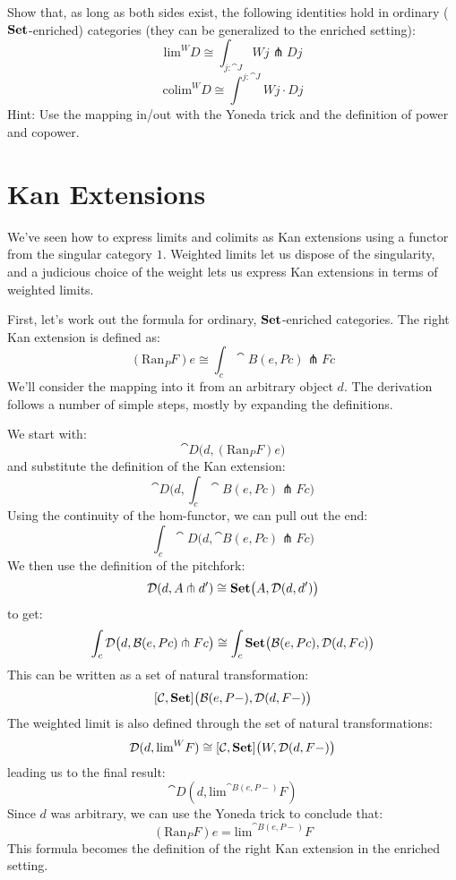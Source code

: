 \documentclass[DaoFP]{subfiles}
\begin{document}
\begin{exercise}
Show that, as long as both sides exist, the following identities hold in ordinary ($\mathbf{Set}$-enriched) categories (they can be generalized to the enriched setting):
\[ \text{lim}^W D \cong \int_{j \colon \cat J} W j \pitchfork D j \]
\[ \text{colim}^W D \cong \int^{j \colon \cat J} W j \cdot D j \]
Hint: Use the mapping in/out with the Yoneda trick and the definition of power and copower.
\end{exercise}

\section{Kan Extensions}

We've seen how to express limits and colimits as Kan extensions using a functor from the singular category $1$. Weighted limits let us dispose of the singularity, and a judicious choice of the weight lets us express Kan extensions in terms of weighted limits. 

First, let's work out the formula for ordinary, $\mathbf{Set}$-enriched categories. The right Kan extension is defined as:
 \[ (\text{Ran}_P F) e \cong \int_c \cat B (e, P c) \pitchfork F c \]
 We'll consider the mapping into it from an arbitrary object $d$. The derivation follows a number of simple steps, mostly by expanding the definitions. 
 
 We start with:
\[ \cat D\big(d, (\text{Ran}_P F) e\big) \]
 and substitute the definition of the Kan extension:
 \[ \cat D\big(d, \int_c \cat B (e, P c) \pitchfork F c\big) \]
Using the continuity of the hom-functor, we can pull out the end:
 \[ \int_c \cat D\big(d,  \cat B (e, P c) \pitchfork F c\big) \]
We then use the definition of the pitchfork:
\[ \mathcal{D} (d, A \pitchfork d') \cong \mathbf{Set}  \big(A, \mathcal{D}(d, d')\big) \]
to get:
 \[ \int_c \mathcal{D}\big(d,  \mathcal{B} (e, P c) \pitchfork F c\big) \cong \int_c \mathbf{Set}\big( \mathcal{B}(e, P c), \mathcal{D}(d, F c)\big)\]
This can be written as a set of natural transformation:
\[ [\mathcal{C}, \mathbf{Set}] \big(\mathcal{B}(e, P-), \mathcal{D}(d, F-)\big) \]
The weighted limit is also defined through the set of natural transformations:
\[  \mathcal D(d, \text{lim}^W F) \cong [\mathcal C, \mathbf{Set}] \big(W, \mathcal D(d, F-)\big) \]
leading us to the final result:
\[ \cat D(d, \text{lim}^{\cat B (e, P-)} F) \]
Since $d$ was arbitrary, we can use the Yoneda trick to conclude that:
\[ (\text{Ran}_P F) e = \text{lim}^{\cat B(e, P-)} F  \]
This formula becomes the definition of the right Kan extension in the enriched setting.
\end{document}
